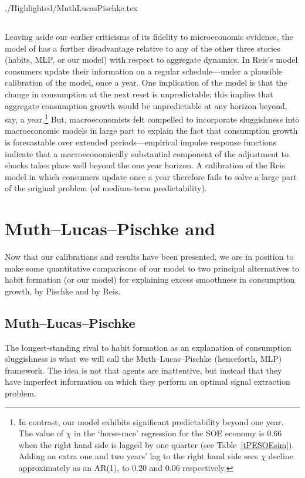 \documentclass[titlepage]{./econtex}
\begin{document}
\begin{verbatimwrite}{./Highlighted/MuthLucasPischke.tex}
\subsection{\cite{reis:inattentive}}

Leaving aside our earlier criticisms of its fidelity to microeconomic evidence, the model of \cite{reis:inattentive} has a further disadvantage relative to any of the other three stories (habits, MLP, or our model) with respect to aggregate dynamics. In Reis's model consumers update their information on a regular schedule---under a plausible calibration of the model, once a year. One implication of the model is that the change in consumption at the next reset is unpredictable; this implies that aggregate consumption growth would be unpredictable at any horizon beyond, say, a year.\footnote{In contrast, our model exhibits significant predictability beyond one year. The value of $\chi$ in the `horse-race' regression for the SOE economy is 0.66 when the right hand side is lagged by one quarter (see Table~\ref{tPESOEsim}). Adding an extra one and two years' lag to the right hand side sees $\chi$ decline approximately as an AR(1), to 0.20 and 0.06 respectively.}  But, macroeconomists felt compelled to incorporate sluggishness into macroeconomic models in large part to explain the fact that consumption growth is forecastable over extended periods---empirical impulse response functions indicate that a macroeconomically substantial component of the adjustment to shocks takes place well beyond the one year horizon.  A calibration of the Reis model in which consumers update once a year therefore fails to solve a large part of the original problem (of medium-term predictability).

\end{verbatimwrite}
\section{Muth--Lucas--Pischke and \cite{reis:inattentive}} \label{sec:Comparisons}

Now that our calibrations and results have been presented, we are in position to make some quantitative comparisons of our model to two principal alternatives to habit formation (or our model) for explaining excess smoothness in consumption growth, by Pischke and by Reis.

\subsection{Muth--Lucas--Pischke}
The longest-standing rival to habit formation as an explanation of consumption sluggishness is what we will call the Muth--Lucas--Pischke (henceforth, MLP) framework.  The idea is not that agents are inattentive, but instead that they have imperfect information on which they perform an optimal signal extraction problem.
\end{document}
